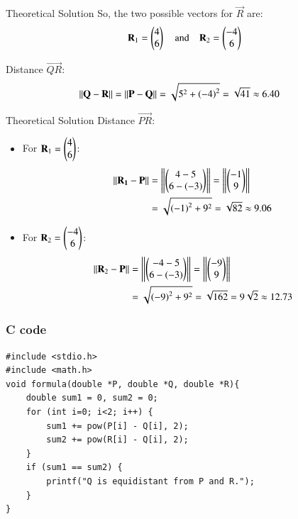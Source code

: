 \documentclass{beamer}
\begin{document}
\begin{frame}{Theoretical Solution}
So, the two possible vectors for $\vec{R}$ are:
\begin{align}
\mathbf{R}_1 = \begin{pmatrix}4 \\ 6\end{pmatrix}  \quad \text{and} \quad  \mathbf{R}_2 = \begin{pmatrix}-4 \\ 6\end{pmatrix}
\end{align}



Distance $\vec{QR}$:
\begin{align}
     \left\lVert\mathbf{Q} - \mathbf{R}\right\rVert&= \left\lVert\mathbf{P} - \mathbf{Q}\right\rVert = \sqrt{5^2 + \left(-4\right)^2} = \sqrt{41} \approx 6.40
\end{align}
\end{frame}



\begin{frame}{Theoretical Solution}
Distance $\vec{PR}$:
\begin{itemize}
    \item For $\mathbf{R}_1 = \begin{pmatrix}4 \\ 6\end{pmatrix}$:
    \begin{align}
     \left\lVert\mathbf{R_1} - \mathbf{P}\right\rVert &= \left\lVert \begin{pmatrix}4 - 5 \\ 6 - \left(-3\right)\end{pmatrix}\right\rVert  = \left\lVert \begin{pmatrix}-1 \\ 9\end{pmatrix}\right\rVert \\
    &= \sqrt{\left(-1\right)^2 + 9^2} = \sqrt{82} \approx 9.06
    \end{align}
    \item For $\mathbf{R}_2 = \begin{pmatrix}-4 \\ 6\end{pmatrix}$:
    \begin{align}
    \left\lVert\mathbf{R}_2 - \mathbf{P}\right\rVert &= \left\lVert\begin{pmatrix}-4 - 5 \\ 6 - (-3)\end{pmatrix}\right\rVert  = \left\lVert\begin{pmatrix}-9 \\ 9\end{pmatrix}\right\rVert \\
    &= \sqrt{\left(-9\right)^2 + 9^2} = \sqrt{162} = 9\sqrt{2} \approx 12.73
    \end{align}
\end{itemize}
\end{frame}

\begin{frame}[fragile]
    \frametitle{C code}
    \begin{lstlisting}
#include <stdio.h>
#include <math.h>
void formula(double *P, double *Q, double *R){
    double sum1 = 0, sum2 = 0;
    for (int i=0; i<2; i++) {
        sum1 += pow(P[i] - Q[i], 2);
        sum2 += pow(R[i] - Q[i], 2);
    }
    if (sum1 == sum2) {
        printf("Q is equidistant from P and R.");
    }
}
    \end{lstlisting}
\end{frame}
\end{document}
